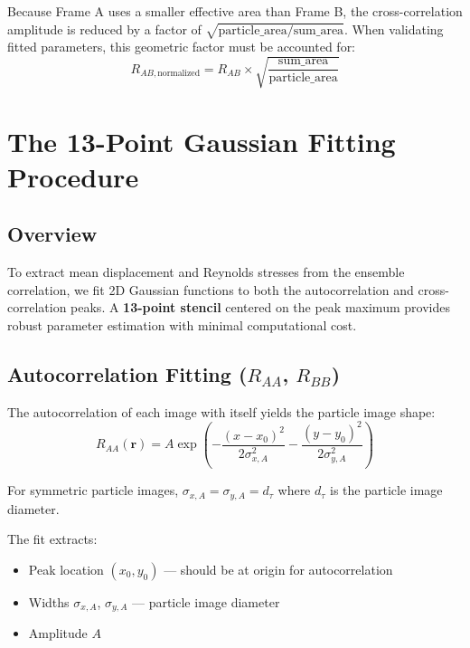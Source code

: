 \documentclass[11pt,a4paper]{article}
\begin{document}
Because Frame A uses a smaller effective area than Frame B, the cross-correlation amplitude is reduced by a factor of $\sqrt{\text{particle\_area} / \text{sum\_area}}$. When validating fitted parameters, this geometric factor must be accounted for:
\begin{equation}
    R_{AB,\text{normalized}} = R_{AB} \times \sqrt{\frac{\text{sum\_area}}{\text{particle\_area}}}
\end{equation}

\section{The 13-Point Gaussian Fitting Procedure}

\subsection{Overview}

To extract mean displacement and Reynolds stresses from the ensemble correlation, we fit 2D Gaussian functions to both the autocorrelation and cross-correlation peaks. A \textbf{13-point stencil} centered on the peak maximum provides robust parameter estimation with minimal computational cost.

\subsection{Autocorrelation Fitting ($R_{AA}$, $R_{BB}$)}

The autocorrelation of each image with itself yields the particle image shape:
\begin{equation}
    R_{AA}(\mathbf{r}) = A \exp\left( -\frac{(x-x_0)^2}{2\sigma_{x,A}^2} - \frac{(y-y_0)^2}{2\sigma_{y,A}^2} \right)
\end{equation}

For symmetric particle images, $\sigma_{x,A} = \sigma_{y,A} = d_\tau$ where $d_\tau$ is the particle image diameter.

The fit extracts:
\begin{itemize}
    \item Peak location $(x_0, y_0)$ --- should be at origin for autocorrelation
    \item Widths $\sigma_{x,A}$, $\sigma_{y,A}$ --- particle image diameter
    \item Amplitude $A$
\end{itemize}
\end{document}
